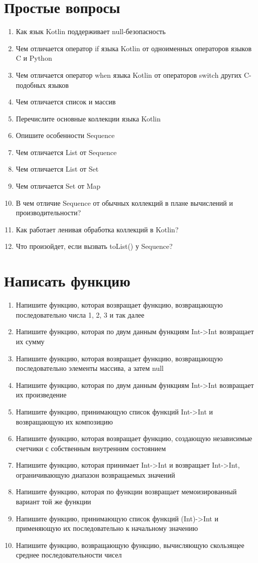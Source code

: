 \documentclass[12pt]{article}
\begin{document}
\section*{Простые вопросы}
\begin{enumerate}
  \item Как язык Kotlin поддерживает null-безопасность
  \item Чем отличается оператор if языка Kotlin от одноименных операторов языков C и Python
  \item Чем отличается оператор when языка Kotlin от операторов switch других C-подобных языков
  \item Чем отличается список и массив
  \item Перечислите основные коллекции языка Kotlin
  \item Опишите особенности Sequence
  \item Чем отличается List от Sequence
  \item Чем отличается List от Set
  \item Чем отличается Set от Map
  \item В чем отличие Sequence от обычных коллекций в плане вычислений и производительности?
  \item Как работает ленивая обработка коллекций в Kotlin?
  \item Что произойдет, если вызвать toList() у Sequence?
\end{enumerate}

\section*{Написать функцию}
\begin{enumerate}
  \item Напишите функцию, которая возвращает функцию, возвращающую последовательно числа 1, 2, 3 и так далее
  \item Напишите функцию, которая по двум данным функциям Int->Int возвращает их сумму
  \item Напишите функцию, которая возвращает функцию, возвращающую последовательно элементы массива, а затем null
  \item Напишите функцию, которая по двум данным функциям Int->Int возвращает их произведение
  \item Напишите функцию, принимающую список функций Int->Int и возвращающую их композицию
  \item Напишите функцию, которая возвращает функцию, создающую независимые счетчики с собственным внутренним состоянием
  \item Напишите функцию, которая принимает Int->Int и возвращает Int->Int, ограничивающую диапазон возвращаемых значений
  \item Напишите функцию, которая по функции возвращает мемоизированный вариант той же функции
  \item Напишите функцию, принимающую список функций (Int)->Int и применяющую их последовательно к начальному значению
  \item Напишите функцию, возвращающую функцию, вычисляющую скользящее среднее последовательности чисел
\end{enumerate}
\end{document}
